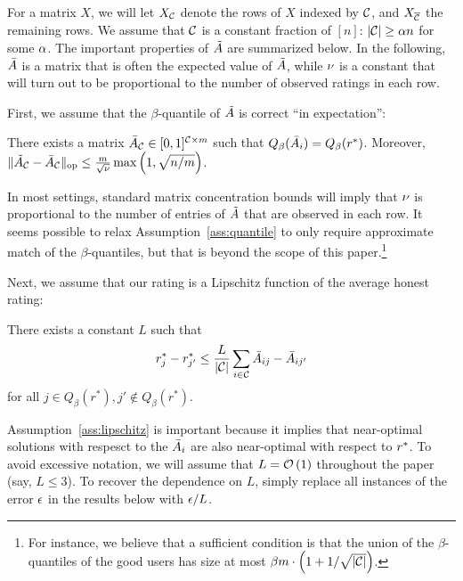 For a matrix $X$, 
we will let $X_{\mathcal{C}}$ denote the rows of $X$ indexed by $\mathcal{C}$, 
and $X_{\overline{\mathcal{C}}}$ the remaining rows. We assume that $\mathcal{C}$ is a constant 
fraction of $[n]$: $|\mathcal{C}| \geq \alpha n$ for some $\alpha$.
The important properties of $\tilde{A}$ are summarized below. In the following, 
$\bar{A}$ is a matrix that is often the expected value of $\tilde{A}$, while 
$\nu$ is a constant that will turn out to be proportional to the number 
of observed ratings in each row.


First, we assume that the $\beta$-quantile of $\tilde{A}$ is correct 
``in expectation'':
\begin{assumption}
\label{ass:quantile}
There exists a matrix $\bar{A}_{\mathcal{C}} \in [0,1]^{\mathcal{C} \times m}$ such that 
$Q_{\beta}(\bar{A}_i) = Q_{\beta}(r^*)$. Moreover, 
$\|\tilde{A}_{\mathcal{C}} - \bar{A}_{\mathcal{C}}\|_{\mathrm{op}} \leq \frac{m}{\sqrt{\nu}}\max\left( 1, \sqrt{n/m} \right)$.
\end{assumption}
In most settings, standard matrix concentration bounds will imply that 
$\nu$ is proportional to the number of entries of $\tilde{A}$ that are observed 
in each row. It seems possible to relax Assumption~\ref{ass:quantile} to only 
require approximate match of the $\beta$-quantiles, but that is beyond the 
scope of this paper.\footnote{For instance, we believe that 
a sufficient condition is that the union of the $\beta$-quantiles of the good 
users has size at most $\beta m \cdot \left( 1 + 1/\sqrt{|\mathcal{C}|} \right)$.}

Next, we assume that our rating is a Lipschitz function of the average 
honest rating:
\begin{assumption}
\label{ass:lipschitz}
There exists a constant $L$ such that 
\[ r^*_j - r^*_{j'} \leq \frac{L}{|\mathcal{C}|}\sum_{i \in \mathcal{C}} \bar{A}_{ij} - \bar{A}_{ij'} \]
for all $j \in Q_{\beta}(r^*), j' \not\in Q_{\beta}(r^*)$.
\end{assumption}
Assumption~\ref{ass:lipschitz} is important because it implies that 
near-optimal solutions with respesct to the $\bar{A}_i$ are also near-optimal 
with respect to $r^*$.
To avoid excessive notation, we will assume that $L = \mathcal{O}\left( 1 \right)$ throughout 
the paper (say, $L \leq 3$). To recover the dependence on $L$, simply replace 
all instances of the error $\epsilon$ in the results below with $\epsilon/L$.

